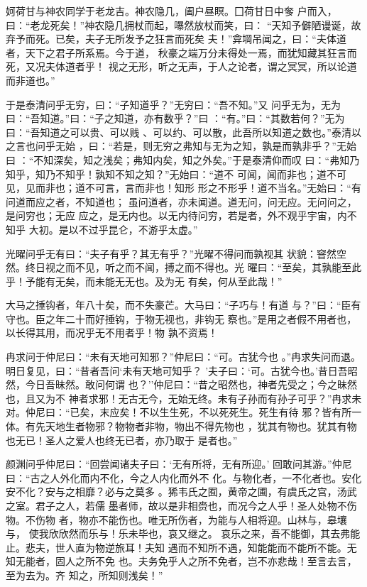 \documentclass[]{article}
\begin{document}
妸荷甘与神农同学于老龙吉。神农隐几，阖户昼瞑。囗荷甘日中奓
户而入，曰：``老龙死矣！''神农隐几拥杖而起，嚗然放杖而笑，曰：
``天知予僻陋谩诞，故弃予而死。已矣，夫子无所发予之狂言而死矣
夫！''弇堈吊闻之，曰：``夫体道者，天下之君子所系焉。今于道，
秋豪之端万分未得处一焉，而犹知藏其狂言而死，又况夫体道者乎！
视之无形，听之无声，于人之论者，谓之冥冥，所以论道而非道也。''

于是泰清问乎无穷，曰：``子知道乎？''无穷曰：``吾不知。''又
问乎无为，无为曰：``吾知道。''曰：``子之知道，亦有数乎？''曰
：``有。''曰：``其数若何？''无为曰：``吾知道之可以贵、可以贱
、可以约、可以散，此吾所以知道之数也。''泰清以之言也问乎无始
，曰：``若是，则无穷之弗知与无为之知，孰是而孰非乎？''无始曰
：``不知深矣，知之浅矣；弗知内矣，知之外矣。''于是泰清仰而叹
曰：``弗知乃知乎，知乃不知乎！孰知不知之知？''无始曰：``道不
可闻，闻而非也；道不可见，见而非也；道不可言，言而非也！知形
形之不形乎！道不当名。''无始曰：``有问道而应之者，不知道也；
虽问道者，亦未闻道。道无问，问无应。无问问之，是问穷也；无应
应之，是无内也。以无内待问穷，若是者，外不观乎宇宙，内不知乎
大初。是以不过乎昆仑，不游乎太虚。''

光曜问乎无有曰：``夫子有乎？其无有乎？''光曜不得问而孰视其
状貌：窨然空然。终日视之而不见，听之而不闻，搏之而不得也。光
曜曰：``至矣，其孰能至此乎！予能有无矣，而未能无无也。及为无
有矣，何从至此哉！''

大马之捶钩者，年八十矣，而不失豪芒。大马曰：``子巧与！有道
与？''曰：``臣有守也。臣之年二十而好捶钩，于物无视也，非钩无
察也。''是用之者假不用者也，以长得其用，而况乎无不用者乎！物 孰不资焉！

冉求问于仲尼曰：``未有天地可知邪？''仲尼曰：``可。古犹今也
。''冉求失问而退。明日复见，曰：``昔者吾问`未有天地可知乎？
'夫子曰：`可。古犹今也。'昔日吾昭然，今日吾昧然。敢问何谓
也？''仲尼曰：``昔之昭然也，神者先受之；今之昧然也，且又为不
神者求邪！无古无今，无始无终。未有子孙而有孙子可乎？''冉求未
对。仲尼曰：``已矣，末应矣！不以生生死，不以死死生。死生有待
邪？皆有所一体。有先天地生者物邪？物物者非物，物出不得先物也
，犹其有物也。犹其有物也无已！圣人之爱人也终无已者，亦乃取于 是者也。''

颜渊问乎仲尼曰：``回尝闻诸夫子曰：`无有所将，无有所迎。'
回敢问其游。''仲尼曰：``古之人外化而内不化，今之人内化而外不
化。与物化者，一不化者也。安化安不化？安与之相靡？必与之莫多
。狶韦氏之囿，黄帝之圃，有虞氏之宫，汤武之室。君子之人，若儒
墨者师，故以是非相赍也，而况今之人乎！圣人处物不伤物。不伤物
者，物亦不能伤也。唯无所伤者，为能与人相将迎。山林与，皋壤与，
使我欣欣然而乐与！乐未毕也，哀又继之。
哀乐之来，吾不能御，其去弗能止。悲夫，世人直为物逆旅耳！夫知
遇而不知所不遇，知能能而不能所不能。无知无能者，固人之所不免
也。夫务免乎人之所不免者，岂不亦悲哉！至言去言，至为去为。齐
知之，所知则浅矣！''
\end{document}

